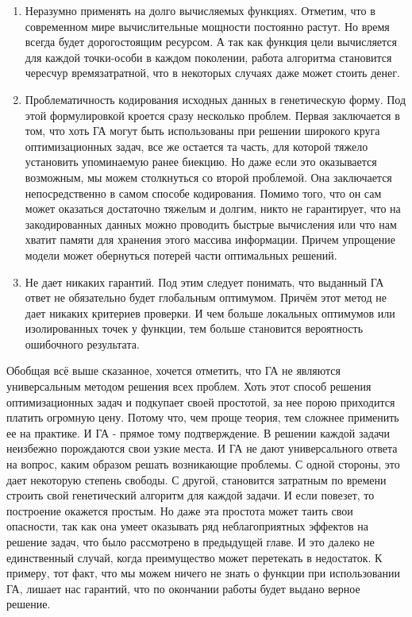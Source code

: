 \begin{enumerate}
\item Неразумно применять на долго вычисляемых функциях. Отметим, что в современном мире вычислительные мощности постоянно растут. Но время всегда будет дорогостоящим ресурсом. А так как функция цели вычисляется для каждой точки-особи в каждом поколении, работа алгоритма становится чересчур времязатратной, что в некоторых случаях даже может стоить денег.
\item Проблематичность кодирования исходных данных в генетическую форму. Под этой формулировкой кроется сразу несколько проблем. Первая заключается в том, что хоть ГА могут быть использованы при решении широкого круга оптимизационных задач, все же остается та часть, для которой тяжело установить упоминаемую ранее биекцию. Но даже если это оказывается возможным, мы можем столкнуться со второй проблемой. Она заключается непосредственно в самом способе кодирования. Помимо того, что он сам может оказаться достаточно тяжелым и долгим, никто не гарантирует, что на закодированных данных можно проводить быстрые вычисления или что нам хватит памяти для хранения этого массива информации. Причем упрощение модели может обернуться потерей части оптимальных решений.
\item Не дает никаких гарантий. Под этим следует понимать, что выданный ГА ответ не обязательно будет глобальным оптимумом. Причём этот метод не дает никаких критериев проверки. И чем больше локальных оптимумов или изолированных точек у функции, тем больше становится вероятность ошибочного результата.
\end{enumerate}
Обобщая всё выше сказанное, хочется отметить, что ГА не являются универсальным методом решения всех проблем. Хоть этот способ решения оптимизационных задач и подкупает своей простотой, за нее порою приходится платить огромную цену. Потому что, чем проще теория, тем сложнее применить ее на практике. И ГА - прямое тому подтверждение. В решении каждой задачи неизбежно порождаются свои узкие места. И ГА не дают универсального ответа на вопрос, каким образом решать возникающие проблемы. С одной стороны, это дает некоторую степень свободы. С другой, становится затратным по времени строить свой генетический алгоритм для каждой задачи. И если повезет, то построение окажется простым. Но даже эта простота может таить свои опасности, так как она умеет оказывать ряд неблагоприятных эффектов на решение задач, что было рассмотрено в предыдущей главе. И это далеко не единственный случай, когда преимущество может перетекать в недостаток. К примеру, тот факт, что мы можем ничего не знать о функции при использовании ГА, лишает нас гарантий, что по окончании работы будет выдано верное решение.

